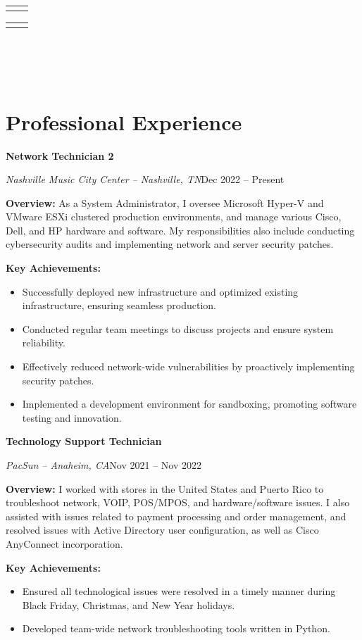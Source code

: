 \documentclass[a4paper]{article}
\makeatletter
\renewcommand{\maketitle}{
  \begin{widebox}
    {\huge\bfseries\textsf\theauthor} \\
    \medskip{}
    \begin{tabular}{@{}c|c@{}}
        \faIcon{linkedin} \textsf{\applinkedinurl{}} & \faIcon{github} \textsf{\appgithuburl{}}
    \end{tabular}
    \begin{tabular}{@{}c|c@{}}
        \faIcon{mobile} \textsf{\appcellphone{}} & \faIcon{envelope} \textsf{\appemail{}}
    \end{tabular} \\
    \medskip{}
    \faIcon{home} \textsf{\appaddresslineone{}} \\
    \textsf{\appaddresslinetwo{}} \\
    \textsf{\appaddresslinethree{}}
  \end{widebox}
}
\makeatother
\begin{document}
\author{\textsf{\appfirstname{} \applastname{}}}

\maketitle

\section{Professional Experience}
\begin{minipage}{\textwidth}
\textbf{Network Technician 2}\par
\textit{Nashville Music City Center -- Nashville, TN}\hfill Dec 2022 -- Present

\medskip
\textbf{Overview:} As a System Administrator, I oversee Microsoft Hyper-V and VMware ESXi clustered production environments, and manage various Cisco, Dell, and HP hardware and software. My responsibilities also include conducting cybersecurity audits and implementing network and server security patches.

\medskip
\textbf{Key Achievements:} 
\begin{itemize}
    \item Successfully deployed new infrastructure and optimized existing infrastructure, ensuring seamless production.
    \item Conducted regular team meetings to discuss projects and ensure system reliability.
    \item Effectively reduced network-wide vulnerabilities by proactively implementing security patches.
    \item Implemented a development environment for sandboxing, promoting software testing and innovation.
\end{itemize}
\end{minipage}

\vspace{10pt}
\begin{minipage}{\textwidth}
\textbf{Technology Support Technician}\par
\textit{PacSun -- Anaheim, CA}\hfill Nov 2021 -- Nov 2022

\medskip
\textbf{Overview:} I worked with stores in the United States and Puerto Rico to troubleshoot network, VOIP, POS/MPOS, and hardware/software issues. I also assisted with issues related to payment processing and order management, and resolved issues with Active Directory user configuration, as well as Cisco AnyConnect incorporation.

\medskip
\textbf{Key Achievements:}
\begin{itemize}
    \item Ensured all technological issues were resolved in a timely manner during Black Friday, Christmas, and New Year holidays.
    \item Developed team-wide network troubleshooting tools written in Python.
\end{itemize}
\end{minipage}
\end{document}

